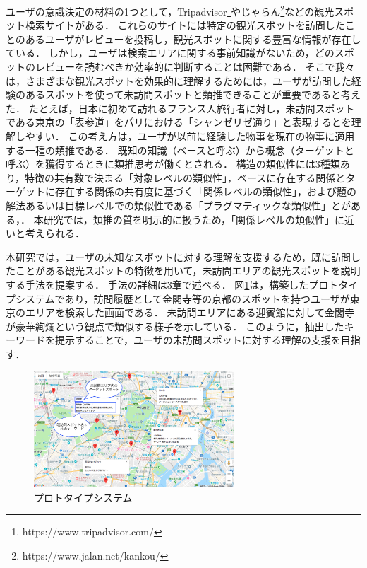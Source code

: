 \documentclass[submit]{ipsj}
\begin{document}
ユーザの意識決定の材料の1つとして，Tripadvisor\footnote{https://www.tripadvisor.com/}やじゃらん\footnote{https://www.jalan.net/kankou/}などの観光スポット検索サイトがある．
これらのサイトには特定の観光スポットを訪問したことのあるユーザがレビューを投稿し，観光スポットに関する豊富な情報が存在している．
しかし，ユーザは検索エリアに関する事前知識がないため，どのスポットのレビューを読むべきか効率的に判断することは困難である．
そこで我々は，さまざまな観光スポットを効果的に理解するためには，ユーザが訪問した経験のあるスポットを使って未訪問スポットと類推できることが重要であると考えた．
たとえば，日本に初めて訪れるフランス人旅行者に対し，未訪問スポットである東京の「表参道」をパリにおける「シャンゼリゼ通り」と表現するとを理解しやすい．
この考え方は，ユーザが以前に経験した物事を現在の物事に適用する一種の類推である．
既知の知識（ベースと呼ぶ）から概念（ターゲットと呼ぶ）を獲得するときに類推思考が働くとされる\cite{Gentner}．
構造の類似性には3種類あり，特徴の共有数で決まる「対象レベルの類似性」，ベースに存在する関係とターゲットに存在する関係の共有度に基づく「関係レベルの類似性」，および題の解法あるいは目標レベルでの類似性である「プラグマティックな類似性」とがある\cite{Gentner}，\cite{Holyoak}．
本研究では，類推の質を明示的に扱うため，「関係レベルの類似性」に近いと考えられる．

本研究では，ユーザの未知なスポットに対する理解を支援するため，既に訪問したことがある観光スポットの特徴を用いて，未訪問エリアの観光スポットを説明する手法を提案する．
手法の詳細は3章で述べる．
図\ref{fig:Photo_Map}は，構築したプロトタイプシステムであり，訪問履歴として金閣寺等の京都のスポットを持つユーザが東京のエリアを検索した画面である．
未訪問エリアにある迎賓館に対して金閣寺が豪華絢爛という観点で類似する様子を示している．
このように，抽出したキーワードを提示することで，ユーザの未訪問スポットに対する理解の支援を目指す．

\begin{figure}[t]
  \begin{center}
    \includegraphics[clip,width=7.5cm]{picture/Photo_Map2_jap.png}
    \caption{プロトタイプシステム}
    \label{fig:Photo_Map}
   \end{center}
\end{figure}
\end{document}
